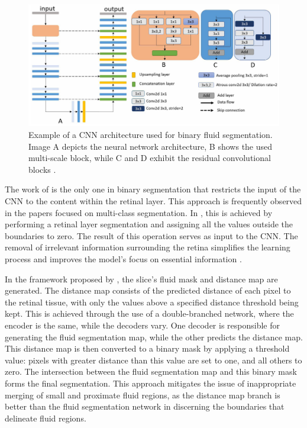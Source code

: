 \begin{figure}[!ht]
	\centering
	\includegraphics[width=1\linewidth]{figures/BinarySegmentationExample.png}
	\caption{Example of a CNN architecture used for binary fluid segmentation. Image A depicts the neural network architecture, B shows the used multi-scale block, while C and D exhibit the residual convolutional blocks \parencite{Guo2020}.}
	\label{fig:BinarySegmentationExample}
\end{figure}
\par
The work of \textcite{Pawan2021} is the only one in binary segmentation that restricts the input of the CNN to the content within the retinal layer. This approach is frequently observed in the papers focused on multi-class segmentation. In \parencite{Pawan2021}, this is achieved by performing a retinal layer segmentation and assigning all the values outside the boundaries to zero. The result of this operation serves as input to the CNN. The removal of irrelevant information surrounding the retina simplifies the learning process and improves the model's focus on essential information \parencite{Mantel2021}.
\par
In the framework proposed by \textcite{Liu2021}, the  slice's fluid mask and distance map are generated. The distance map consists of the predicted distance of each pixel to the retinal tissue, with only the values above a specified distance threshold being kept. This is achieved through the use of a double-branched network, where the encoder is the same, while the decoders vary. One decoder is responsible for generating the fluid segmentation map, while the other predicts the distance map. This distance map is then converted to a binary mask by applying a threshold value: pixels with greater distance than this value are set to one, and all others to zero. The intersection between the fluid segmentation map and this binary mask forms the final segmentation. This approach mitigates the issue of inappropriate merging of small and proximate fluid regions, as the distance map branch is better than the fluid segmentation network in discerning the boundaries that delineate fluid regions.
